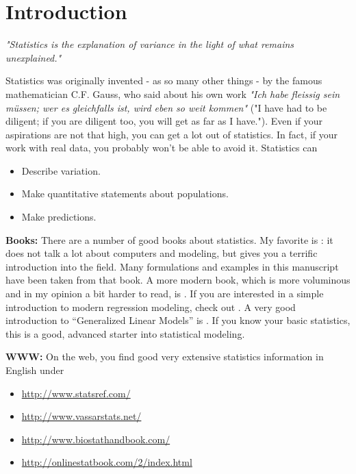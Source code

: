 \chapter{Introduction}

\emph{"Statistics is the explanation of variance in the light of what remains
unexplained."}

\vspace{5 mm}

Statistics was originally invented - as so many other things - by the famous mathematician C.F. Gauss, who said about his own work \emph{"Ich habe fleissig sein m\"ussen; wer es gleichfalls ist, wird eben so weit kommen"} ("I have had to be diligent; if you are diligent too, you will get as far as I have."). Even if your aspirations are not that high, you can get a lot out of statistics. In fact, if your work with real data, you probably won't be able to avoid it. Statistics can

\begin{itemize}
  \item Describe variation.
  \item Make quantitative statements about populations.
  \item Make predictions.
\end{itemize}

\textbf{Books: }There are a number of good books about statistics. My favorite is \cite{altman99}: it does not talk a lot about computers and modeling, but gives you a terrific introduction into the field. Many formulations and examples in this manuscript have been taken from that book. A more modern book, which is more voluminous and in my opinion a bit harder to read, is \cite{Riffenburgh2012}. If you are interested in a simple introduction to modern regression modeling, check out \cite{Kaplan2009}. A very good introduction to “Generalized Linear Models” is \cite{Dobson2008}. If you know your basic statistics, this is a good, advanced starter into statistical modeling.

\vspace{5 mm}

\textbf{WWW: }On the web, you find good very extensive statistics information in English under
\begin{itemize}
    \item \url{http://www.statsref.com/}
    \item \url{http://www.vassarstats.net/}
    \item \url{http://www.biostathandbook.com/}
    \item \url{http://onlinestatbook.com/2/index.html}
\end{itemize}

